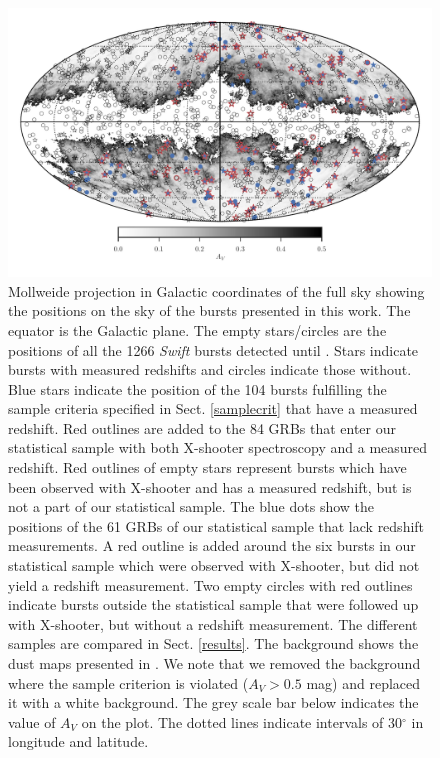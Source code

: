 \documentclass[longauth]{aa}    %
\begin{document}
\begin{figure}
	\centerline{\includegraphics[width=\linewidth]{figures/skymap.pdf}} \caption{Mollweide projection
	in Galactic coordinates of the full sky showing the positions on the sky of the
	bursts presented in this work. The equator is the Galactic plane. The empty
	stars/circles are the positions of all the 1266 \textit{Swift} bursts detected
	until \termdate. Stars indicate bursts with measured redshifts and circles
	indicate those without. Blue stars indicate the position of the 104 bursts
	fulfilling the sample criteria specified in Sect. \ref{samplecrit} that have a
	measured redshift. Red outlines are added to the 84 GRBs that enter our
	statistical sample with both X-shooter spectroscopy and a measured redshift.
	Red outlines of empty stars represent bursts which have been observed with
	X-shooter and has a measured redshift, but is not a part of our statistical
	sample. The blue dots show the positions of the 61 GRBs of our statistical
	sample that lack redshift measurements. A red outline is added around the six
	bursts in our statistical sample which were observed with X-shooter, but did
	not yield a redshift measurement. Two empty circles with red outlines indicate
	bursts outside the statistical sample that were followed up with X-shooter, but
	without a redshift measurement. The different samples are compared in Sect.
	\ref{results}. The background shows the dust maps presented in
	\citet{Schlegel1998}. We note that we removed the background where the
	sample criterion is violated ($A_V > 0.5$ mag) and replaced it with a white
	background. The grey scale bar below indicates the value of $A_V$ on the plot.
	The dotted lines indicate intervals of 30$^\circ$ in longitude and latitude.}
\label{fig:skymap}
\end{figure}
\end{document}
